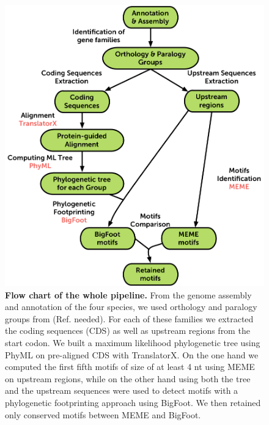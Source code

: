 \documentclass[10pt]{article}
\begin{document}
\begin{figure}[!ht]
\begin{center}
\includegraphics{Figures/Pipeline.png}
\end{center}
\caption{
{\bf Flow chart of the whole pipeline.}  From the genome assembly and annotation of the four species, we used orthology and paralogy groups from (Ref. needed). For each of these families we extracted the coding sequences (CDS) as well as upstream regions from the start codon. We built a maximum likelihood phylogenetic tree using PhyML on pre-aligned CDS with TranslatorX. On the one hand we computed the first fifth motifs of size of at least 4 nt using MEME on upstream regions, while on the other hand using both the tree and the upstream sequences were used to detect motifs with a phylogenetic footprinting approach using BigFoot. We then retained only conserved motifs between MEME and BigFoot.
}
\label{fig:Pipeline}
\end{figure}
\end{document}
